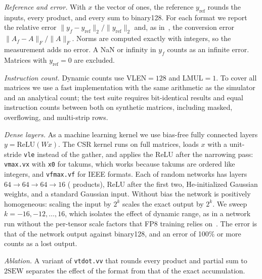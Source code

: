 \documentclass[conference]{IEEEtran}
\newcommand{\code}[1]{\texttt{#1}}
\begin{document}
\emph{Reference and error.} With $x$ the vector of ones, the reference
$y_{\mathrm{ref}}$ rounds the inputs, every product, and every sum to binary128.
For each format we report the relative error
$\|y_f-y_{\mathrm{ref}}\|_2/\|y_{\mathrm{ref}}\|_2$ and, as in~\cite{simd}, the
conversion error $\|A_f-A\|_F/\|A\|_F$. Norms are computed exactly with
integers, so the measurement adds no error. A NaN or infinity in $y_f$ counts as
an infinite error. Matrices with $y_{\mathrm{ref}}=0$ are excluded.

\emph{Instruction count.} Dynamic counts use VLEN${}=128$ and LMUL${}=1$. To
cover all matrices we use a fast implementation with the same arithmetic as the
simulator and an analytical count; the test suite requires bit-identical
results and equal instruction counts between both on synthetic matrices,
including masked, overflowing, and multi-strip rows.

\emph{Dense layers.} As a machine learning kernel we use bias-free fully
connected layers $y=\mathrm{ReLU}(Wx)$. The CSR kernel runs on full matrices,
loads $x$ with a unit-stride \code{vle} instead of the gather, and applies the
ReLU after the narrowing pass: \code{vmax.vx} with \code{x0} for takums, which
works because takums are ordered like integers, and \code{vfmax.vf} for IEEE
formats. Each of \MlpTrials{} random networks has layers
$64\to64\to64\to16$ (\MlpMacs{} products), ReLU after the first two,
He-initialized Gaussian weights, and a standard Gaussian input. Without bias
the network is positively homogeneous: scaling the input by $2^k$ scales the
exact output by $2^k$. We sweep $k=-16,-12,\dots,16$, which isolates the effect
of dynamic range, as in a network run without the per-tensor scale factors that
FP8 training relies on~\cite{fp8dl}. The error is that of the network output
against binary128, and an error of 100\% or more counts as a lost output.

\emph{Ablation.} A variant of \code{vtdot.vv} that rounds every product and
partial sum to $2\mathrm{SEW}$ separates the effect of the
format from that of the exact accumulation.
\end{document}
